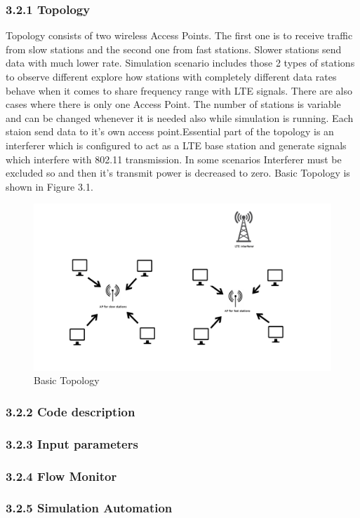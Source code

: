\subsubsection{\hspace*{1cm}3.2.1 Topology}
	\textnormal{\hspace*{1cm}Topology consists of two wireless Access Points. The first one is to receive traffic from slow stations and the second one from fast stations. Slower stations send data with much lower rate. Simulation scenario includes those 2 types of stations to observe different explore how stations with completely different data rates behave when it comes to share frequency range with LTE signals. There are also cases where there is  only one Access Point. The number of stations is variable and can be changed whenever it is needed also while simulation is running. Each staion send data to it's own access point.\newline\hspace*{1cm}Essential part of the topology is an interferer which is configured to act as a LTE base station and generate signals which interfere with 802.11 transmission. In some scenarios Interferer must be excluded so and then it's transmit power is decreased to zero. Basic Topology is shown in Figure 3.1. }
	\begin{figure}[h]
	\includegraphics[scale=0.25]{Images/topology}
	
	\caption{Basic Topology}
	\end{figure}
\subsubsection{3.2.2 Code description}
\subsubsection{3.2.3 Input parameters}
\subsubsection{3.2.4 Flow Monitor}
\subsubsection{3.2.5 Simulation Automation}
